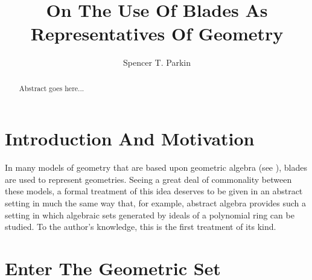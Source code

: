 \documentclass{birkjour}
\theoremstyle{definition}
\theoremstyle{remark}
\numberwithin{equation}{section}
\begin{document}
\title{On The Use Of Blades As Representatives Of Geometry}

\author{Spencer T. Parkin}
\address{102 W. 500 S., \\
Salt Lake City, UT  84101} 



\begin{abstract}
Abstract goes here...
\end{abstract}


\maketitle

\section{Introduction And Motivation}

In many models of geometry that are based upon geometric algebra (see \cite{}), blades are used
to represent geometries.  Seeing a great deal of commonality between these models, a formal
treatment of this idea deserves to be given in an abstract setting in much the same way that,
for example, abstract algebra provides such a setting in which algebraic sets generated by ideals
of a polynomial ring can be studied.  To the author's knowledge, this is the first treatment of its kind.

\section{Enter The Geometric Set}
\end{document}
